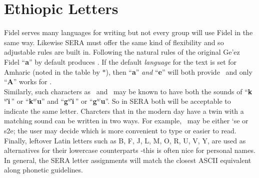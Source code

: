 
\section*{Ethiopic Letters}

Fidel serves many languages for writing but not every group will use Fidel in the same way.
Likewise SERA must offer the same kind of flexibility and so adjustable rules are built in.
Following the natural rules of the original Ge'ez Fidel ``{\bf a}'' by default
produces \a  .  If the default {\em language} for the text is set for Amharic (noted in the
table by {\bf $\ast$}),
then ``{\bf a}'' {\em and} ``{\bf e}'' will both provide \ea \ and only 
``{\bf A}'' works for \a .  \\ 

Similarly, such characters as \kWu \ and \gWu \ may be known to have both the sounds of
``{\bf k$^w${\"\i}}\,'' or ``{\bf k$^w$u}'' and  
``{\bf g$^w${\"\i}}\,'' or ``{\bf g$^w$u}''.
So in SERA both will be acceptable
to indicate the same letter.  Charcters that in the modern day have a twin with a
matching sound can be written in two ways.  For example, \sse \ may be either `se or s2e; 
the user may decide which is more convenient to type or easier to read.\\

Finally, leftover Latin letters such as B, F, J, L, M, O, R, U, V, Y, are used as alternatives
for their lowercase counterparts -this is often nice for personal names. In general, the SERA
letter assignments will match the closest ASCII equivalent along phonetic guidelines.\\

\newpage
\noi
\hspace*{-0.7in}{\Large\bf The SERA Fidel Syllabry} \\

